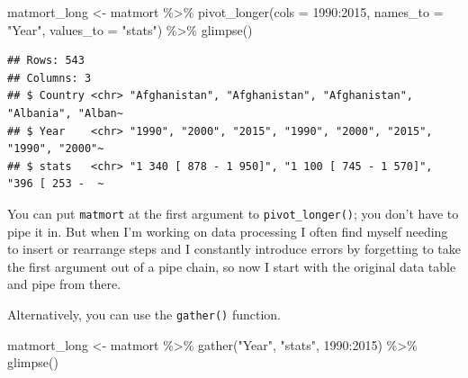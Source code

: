 \documentclass[
  oneside]{book}
\newenvironment{Shaded}{\begin{snugshade}}{\end{snugshade}}
\newcommand{\AttributeTok}[1]{\textcolor[rgb]{0.77,0.63,0.00}{#1}}
\newcommand{\FunctionTok}[1]{\textcolor[rgb]{0.00,0.00,0.00}{#1}}
\newcommand{\NormalTok}[1]{#1}
\newcommand{\OtherTok}[1]{\textcolor[rgb]{0.56,0.35,0.01}{#1}}
\newcommand{\SpecialCharTok}[1]{\textcolor[rgb]{0.00,0.00,0.00}{#1}}
\newcommand{\StringTok}[1]{\textcolor[rgb]{0.31,0.60,0.02}{#1}}
\begin{document}
\begin{Shaded}
\begin{Highlighting}[]
\NormalTok{matmort\_long }\OtherTok{\textless{}{-}}\NormalTok{ matmort }\SpecialCharTok{\%\textgreater{}\%}
  \FunctionTok{pivot\_longer}\NormalTok{(}\AttributeTok{cols =} \StringTok{\textasciigrave{}}\AttributeTok{1990}\StringTok{\textasciigrave{}}\SpecialCharTok{:}\StringTok{\textasciigrave{}}\AttributeTok{2015}\StringTok{\textasciigrave{}}\NormalTok{,}
               \AttributeTok{names\_to =} \StringTok{"Year"}\NormalTok{,}
               \AttributeTok{values\_to =} \StringTok{"stats"}\NormalTok{) }\SpecialCharTok{\%\textgreater{}\%}
  \FunctionTok{glimpse}\NormalTok{()}
\end{Highlighting}
\end{Shaded}

\begin{verbatim}
## Rows: 543
## Columns: 3
## $ Country <chr> "Afghanistan", "Afghanistan", "Afghanistan", "Albania", "Alban~
## $ Year    <chr> "1990", "2000", "2015", "1990", "2000", "2015", "1990", "2000"~
## $ stats   <chr> "1 340 [ 878 - 1 950]", "1 100 [ 745 - 1 570]", "396 [ 253 -  ~
\end{verbatim}

\begin{info}
You can put \texttt{matmort} at the first argument to \texttt{pivot\_longer()}; you don't have to pipe it in. But when I'm working on data processing I often find myself needing to insert or rearrange steps and I constantly introduce errors by forgetting to take the first argument out of a pipe chain, so now I start with the original data table and pipe from there.

\end{info}

Alternatively, you can use the \texttt{gather()} function.

\begin{Shaded}
\begin{Highlighting}[]
\NormalTok{matmort\_long }\OtherTok{\textless{}{-}}\NormalTok{ matmort }\SpecialCharTok{\%\textgreater{}\%}
  \FunctionTok{gather}\NormalTok{(}\StringTok{"Year"}\NormalTok{, }\StringTok{"stats"}\NormalTok{, }\StringTok{\textasciigrave{}}\AttributeTok{1990}\StringTok{\textasciigrave{}}\SpecialCharTok{:}\StringTok{\textasciigrave{}}\AttributeTok{2015}\StringTok{\textasciigrave{}}\NormalTok{) }\SpecialCharTok{\%\textgreater{}\%}
  \FunctionTok{glimpse}\NormalTok{()}
\end{Highlighting}
\end{Shaded}
\end{document}
